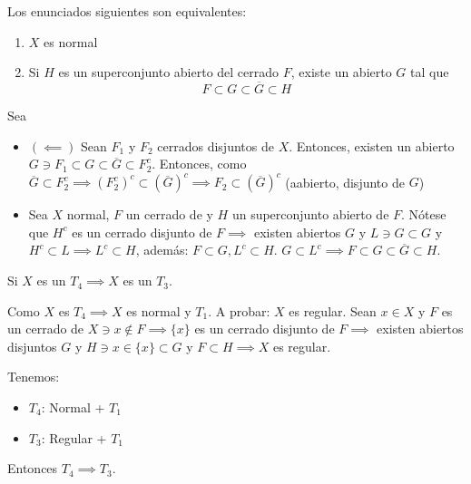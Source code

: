 \begin{teorema}
    Los enunciados siguientes son equivalentes: 
    \begin{enumerate}
        \item $X$ es normal 
        \item Si $H$ es un superconjunto abierto del cerrado $F$, existe un abierto $G$ tal que 
        $$F\subset G\subset \overline{G}\subset H$$
    \end{enumerate}
    \begin{dem}
        Sea
        \begin{itemize}
            \item $(\impliedby)$ Sean $F_1$ y $F_2$ cerrados disjuntos de $X$. Entonces, existen un abierto $G\ni F_1\subset G\subset \overline{G}\subset F_2^c$. Entonces, como $\overline{G}\subset F_2^c\implies (F_2^c)^c\subset (\overline{G})^c\implies F_2\subset (\overline{G})^c$ (aabierto, disjunto de $G$)
            \item Sea $X$ normal, $F$ un cerrado de y $H$ un superconjunto abierto de $F$. Nótese que $H^c$ es un cerrado disjunto de $F\implies$ existen abiertos $G$ y $L\ni G\subset G$ y $H^c \subset L\implies L^c\subset H$, además: $F\subset G,L^c\subset H$. $G\subset L^c\implies F\subset G\subset \overline{G}\subset H$. 
        \end{itemize}
    \end{dem}
\end{teorema}

\begin{prop}
    Si $X$ es un $T_4\implies X$ es un $T_3$.
\end{prop}

\begin{dem}
    Como $X$ es $T_4\implies X$ es normal y $T_1$. A probar: $X$ es regular. Sean $x\in X$ y $F$ es un cerrado de $X\ni x\not\in F\implies \{x\}$ es un cerrado disjunto de $F\implies $ existen abiertos disjuntos $G$ y $H\ni x\in \{x\}\subset G$ y $F\subset H\implies X$ es regular.   
\end{dem}



\begin{cajita}
    Tenemos: 
    \begin{itemize}
        \item $T_4$: Normal + $T_1$ 
        \item $T_3$: Regular + $T_1$
    \end{itemize}
    Entonces $T_4\implies T_3$.
\end{cajita}

